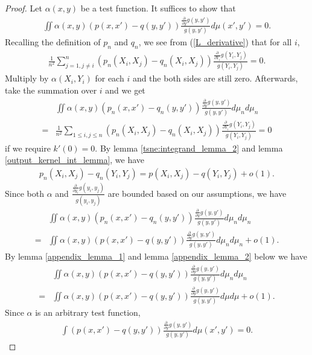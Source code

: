 \documentclass[10pt]{article}
\newenvironment{Proof of lemma}{\noindent{\bf Proof of Lemma}}{\hfill$\Box$\newline}
\newenvironment{Proof of claim}{\noindent{\bf Proof of claim}}{\hfill$\Box$\newline}
\newenvironment{Proof of theorem}{\noindent{\bf Proof of Theorem}}{\hfill\scriptsize{$\Box$}\newline}
\newenvironment{Proof of theorems}{\noindent{\bf Proof of Theorems}}{\hfill$\Box$\newline}
\newenvironment{Proof of proposition}{\noindent{\bf Proof of Proposition}}{\hfill$\Box$\newline}
\newenvironment{Proof of propositions}{\noindent{\bf Proof of Propositions}}{\hfill$\Box$\newline}
\newenvironment{Proof of exercise}{\noindent{\it Proof of Exercise:}}{\hfill$\Box$}
\numberwithin{equation}{section}
\begin{document}
\begin{proof}
    Let $\alpha(x,y)$ be a test function. It suffices to show that
    \begin{align}
        \iint \alpha(x,y)(p(x,x')-q(y,y')) \frac{\frac{\partial}{\partial y}g(y,y')}{g(y,y')} d\mu(x',y') = 0.
    \end{align}
    Recalling the definition of $p_n$ and $q_n$, we see from (\ref{L_derivative}) that for all $i$,
    \begin{align}
        \frac{1}{n^2}\sum_{j=1,j \neq i}^n (p_n(X_i,X_j)-q_n(X_i,X_j)) \frac{\frac{\partial}{\partial Y_i}g(Y_i,Y_j)}{g(Y_i,Y_j)} = 0.
    \end{align}
    Multiply by $\alpha(X_i,Y_i)$ for each $i$ and the both sides are still zero. Afterwards, take the summation over $i$ and we get
    \begin{align}
          & \iint \alpha(x,y)(p_n(x,x')-q_n(y,y')) \frac{\frac{\partial}{\partial y}g(y,y')}{g(y,y')} d\mu_n d\mu_n \nonumber                \\
        = & \frac{1}{n^2}\sum_{1 \leq i,j \leq n} (p_n(X_i,X_j)-q_n(X_i,X_j)) \frac{\frac{\partial}{\partial Y_i}g(Y_i,Y_j)}{g(Y_i,Y_j)} = 0
    \end{align}
    if we require $k'(0) = 0$.
    By lemma \ref{tsne:integrand_lemma_2} and lemma \ref{output_kernel_int_lemma}, we have
    \begin{align}
        p_n(X_i,X_j)-q_n(Y_i,Y_j) = p(X_i,X_j)-q(Y_i,Y_j) + o(1).
    \end{align}
    Since both $\alpha$ and $\frac{\frac{\partial}{\partial y_i}g(y_i,y_j)}{g(y_i,y_j)}$ are bounded based on our assumptions, we have
    \begin{align}
          & \iint \alpha(x,y)(p_n(x,x')-q_n(y,y')) \frac{\frac{\partial}{\partial y}g(y,y')}{g(y,y')} d\mu_n d\mu_n \nonumber \\
        = & \iint \alpha(x,y)(p(x,x')-q(y,y')) \frac{\frac{\partial}{\partial y}g(y,y')}{g(y,y')} d\mu_n d\mu_n + o(1).
    \end{align}
    By lemma \ref{appendix_lemma_1} and lemma \ref{appendix_lemma_2} below we have
    \begin{align}
          & \iint \alpha(x,y)(p(x,x')-q(y,y')) \frac{\frac{\partial}{\partial y}g(y,y')}{g(y,y')} d\mu_n d\mu_n \nonumber \\
        = & \iint \alpha(x,y)(p(x,x')-q(y,y')) \frac{\frac{\partial}{\partial y}g(y,y')}{g(y,y')} d\mu d\mu + o(1).
    \end{align}
    Since $\alpha$ is an arbitrary test function,
    \begin{align}
        \int (p(x,x')-q(y,y')) \frac{\frac{\partial}{\partial y}g(y,y')}{g(y,y')} d\mu(x',y') = 0.
    \end{align}
\end{proof}
\end{document}
